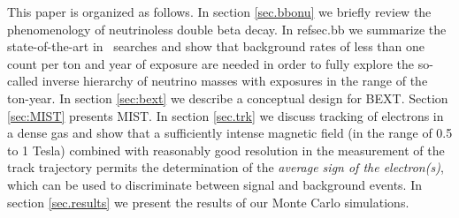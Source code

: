 This paper is organized as follows. In section \ref{sec.bbonu} we briefly review the phenomenology of neutrinoless double beta decay. In ref{sec.bb} we summarize the state-of-the-art in \bbonu\ searches and show that background rates of less than one count per ton and year of exposure are needed in order to fully explore the so-called inverse hierarchy of neutrino masses with exposures in the range of the ton-year. In section \ref{sec:bext} we describe a conceptual design for BEXT. Section \ref{sec:MIST} presents MIST. In section 
\ref{sec.trk} we discuss tracking of electrons in a dense gas and show that a sufficiently intense magnetic field (in the range of 0.5 to 1 Tesla) combined with reasonably good resolution in the measurement of the track trajectory permits the determination of the {\em average sign of the electron(s)}, which can be used to discriminate between signal and background events. In section \ref{sec.results} we present the results of our Monte Carlo simulations.


